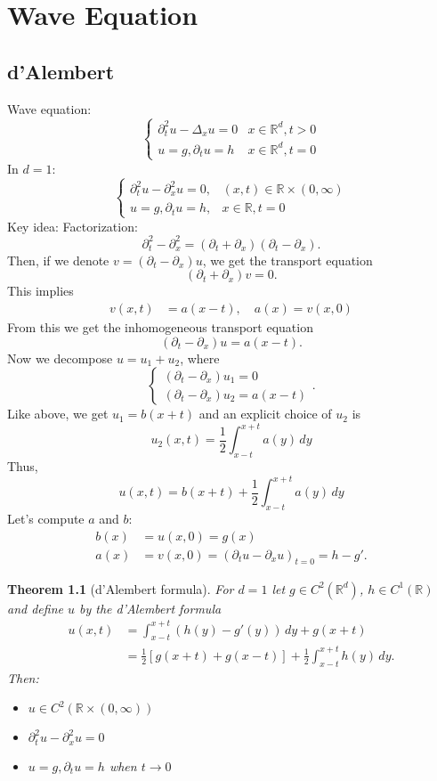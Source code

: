 \documentclass{report}
\theoremstyle{tommy}
\newtheorem{thm}[defn]{Theorem}
\begin{document}
	\chapter{Wave Equation}
	\section{d'Alembert}
	Wave equation:
	\[\begin{cases}
		\partial_t^2 u - \Delta_x u = 0 &x \in \mathbb{R}^d, t > 0 \\
		u = g, \partial_t u = h &x \in \mathbb{R}^d, t = 0
	\end{cases}\]
	In \(d=1\):
	\[\begin{cases}
		\partial_t^2 u - \partial_x^2 u = 0, & (x,t) \in \mathbb{R} \times (0,\infty) \\
		u = g, \partial_t u = h, & x \in \mathbb{R}, t = 0
	\end{cases}\]
	Key idea: Factorization:
	\[\partial_t^2 - \partial_x^2 = (\partial_t + \partial_x) (\partial_t - \partial_x).\]
	Then, if we denote \(v = (\partial_t - \partial_x) u\), we get the transport equation
		\[(\partial_t + \partial_x) v = 0.\]
	This implies 
	\begin{align*}
		v(x,t) &= a(x-t), \quad a(x) = v(x,0)
	\end{align*}
	From this we get the inhomogeneous transport equation
	\[(\partial_t - \partial_x) u = a(x-t).\]
	Now we decompose \(u = u_1 + u_2\), where 
	\[\begin{cases}
		(\partial_t - \partial_x) u_1 = 0 \\
		(\partial_t - \partial_x) u_2 = a (x-t)
	\end{cases}.\]
	Like above, we get \(u_1 = b(x+t)\) and an explicit choice of \(u_2\) is
	\[u_2(x,t) = \frac{1}{2} \int_{x-t}^{x+t} a(y) \, dy\]
	Thus,
	\[u(x,t) = b(x+t) + \frac{1}{2} \int_{x-t}^{x+t} a(y) \, dy\]
	Let's compute \(a\) and \(b\):\
	\begin{align*}
		b(x) &= u(x,0) = g(x) \\
		a(x) &= v(x,0) = (\partial_t u - \partial_x u)_{t = 0} = h-g'.
	\end{align*}
	
	\begin{thm}[d'Alembert formula]
		For \(d = 1\) let \(g \in C^2(\mathbb{R}^d)\), \(h \in C^1(\mathbb{R})\) and define \(u\) by the \emph{d'Alembert formula}
		\begin{align*}
			u(x,t) &= \int_{x-t}^{x+t} (h(y)-g'(y)) \, dy + g(x+t) \\
			&= \frac{1}{2} [g(x+t)+g(x-t)] + \frac{1}{2} \int_{x-t}^{x+t} h(y) \, dy.
		\end{align*}
		Then:
		\begin{itemize}
			\item \(u \in C^2(\mathbb{R} \times (0,\infty))\)
			\item \(\partial_t^2 u - \partial_x^2 u = 0\) 
			\item \(u = g, \partial_t u = h\) when \(t \to 0\)
		\end{itemize}
	\end{thm}
\end{document}
